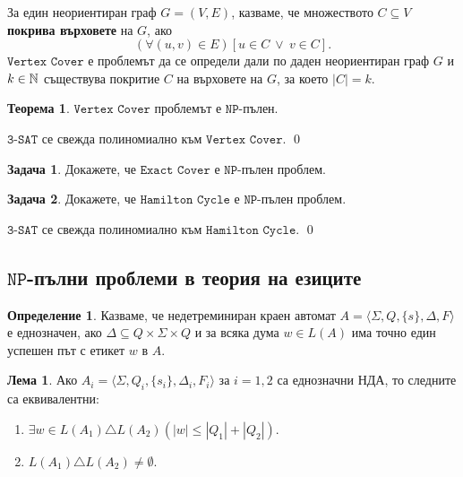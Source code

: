 \documentclass[a4paper]{article}
\theoremstyle{definition}
\newtheorem{theorem}{Теорема}
\newtheorem{lemma}{Лема}
\newtheorem{definition}{Определение}
\newtheorem{problem}{Задача}
\newenvironment{hint}{\noindent{\bf Упътване.}\hspace*{1em}}{\qed\par\vspace*{1em}}
\begin{document}
За един неориентиран граф $G = (V,E)$,
казваме, че множеството $C \subseteq V$ {\bf покрива върховете} на $G$, ако
\[(\forall (u,v) \in E)[u \in C\ \lor\ v \in C].\]
$\texttt{Vertex Cover}$ е проблемът да се определи дали по даден неориентиран граф $G$ и $k \in \mathbb{N}$
съществува покритие $C$ на върховете на $G$, за което $|C| = k$.

\begin{theorem}
  $\texttt{Vertex Cover}$ проблемът е $\texttt{NP}$-пълен.
\end{theorem}
\begin{hint}
  $\texttt{3-SAT}$ се свежда полиномиално към $\texttt{Vertex Cover}$.
\end{hint}

\begin{problem}
  Докажете, че $\texttt{Exact Cover}$ е $\texttt{NP}$-пълен проблем.
\end{problem}

\begin{problem}
  Докажете, че $\texttt{Hamilton Cycle}$ е $\texttt{NP}$-пълен проблем.
\end{problem}
\begin{hint}
  $\texttt{3-SAT}$ се свежда полиномиално към $\texttt{Hamilton Cycle}$.
\end{hint}



\subsection*{$\texttt{NP}$-пълни проблеми в теория на езиците}

\begin{definition}
Казваме, че недетреминиран краен автомат $A=\langle \Sigma,Q,\{s\},\Delta,F\rangle$ е еднозначен,
ако $\Delta\subseteq Q\times \Sigma\times Q$ и за всяка дума $w\in L(A)$ има точно един успешен път с етикет $w$ в $A$.
\end{definition}

\begin{lemma}
  Ако $A_i=\langle \Sigma,Q_i,\{s_i\},\Delta_i,F_i\rangle$ за $i=1,2$ са еднозначни НДА, то следните са еквивалентни:
  \begin{enumerate}
  \item $\exists w\in L(A_1)\triangle L(A_2) (|w|\le |Q_1|+|Q_2|)$.
  \item $L(A_1)\triangle L(A_2)\neq\emptyset$.
  \end{enumerate} 
\end{lemma}
\end{document}
